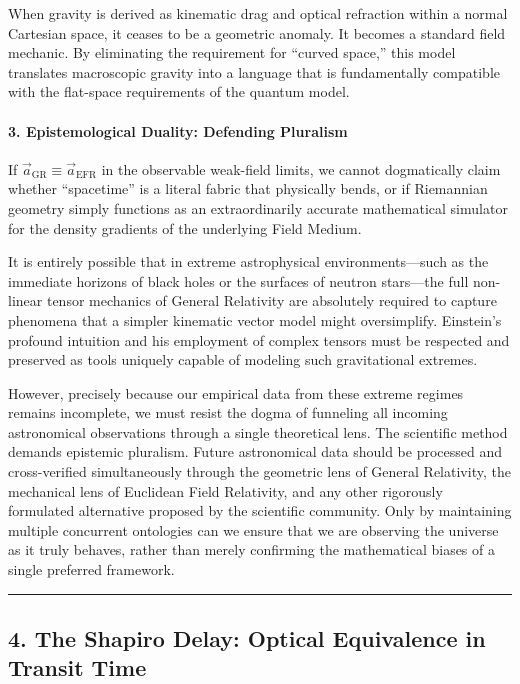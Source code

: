 \documentclass[twocolumn]{article}
\begin{document}
When gravity is derived as kinematic drag and optical refraction within
a normal Cartesian space, it ceases to be a geometric anomaly. It
becomes a standard field mechanic. By eliminating the requirement for
``curved space,'' this model translates macroscopic gravity into a
language that is fundamentally compatible with the flat-space
requirements of the quantum model.

\paragraph{3. Epistemological Duality: Defending
Pluralism}\label{epistemological-duality-defending-pluralism}

If \(\vec{a}_{\text{GR}} \equiv \vec{a}_{\text{EFR}}\) in the observable
weak-field limits, we cannot dogmatically claim whether ``spacetime'' is
a literal fabric that physically bends, or if Riemannian geometry simply
functions as an extraordinarily accurate mathematical simulator for the
density gradients of the underlying Field Medium.

It is entirely possible that in extreme astrophysical
environments---such as the immediate horizons of black holes or the
surfaces of neutron stars---the full non-linear tensor mechanics of
General Relativity are absolutely required to capture phenomena that a
simpler kinematic vector model might oversimplify. Einstein's profound
intuition and his employment of complex tensors must be respected and
preserved as tools uniquely capable of modeling such gravitational
extremes.

However, precisely because our empirical data from these extreme regimes
remains incomplete, we must resist the dogma of funneling all incoming
astronomical observations through a single theoretical lens. The
scientific method demands epistemic pluralism. Future astronomical data
should be processed and cross-verified simultaneously through the
geometric lens of General Relativity, the mechanical lens of Euclidean
Field Relativity, and any other rigorously formulated alternative
proposed by the scientific community. Only by maintaining multiple
concurrent ontologies can we ensure that we are observing the universe
as it truly behaves, rather than merely confirming the mathematical
biases of a single preferred framework.

\begin{center}\rule{0.5\linewidth}{0.5pt}\end{center}

\subsection{4. The Shapiro Delay: Optical Equivalence in Transit
Time}\label{the-shapiro-delay-optical-equivalence-in-transit-time}
\end{document}
